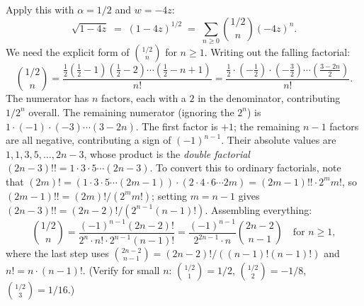 Apply this with $\alpha = 1/2$ and $w = -4z$:
\[
  \sqrt{1-4z} \;=\; (1-4z)^{1/2} \;=\; \sum_{n \ge 0} \binom{1/2}{n}(-4z)^n.
\]
We need the explicit form of $\binom{1/2}{n}$ for $n \ge 1$. Writing out the falling factorial:
\[
  \binom{1/2}{n} = \frac{\tfrac{1}{2}(\tfrac{1}{2}-1)(\tfrac{1}{2}-2)\cdots(\tfrac{1}{2}-n+1)}{n!}
  = \frac{\tfrac{1}{2}\cdot(-\tfrac{1}{2})\cdot(-\tfrac{3}{2})\cdots(\tfrac{3-2n}{2})}{n!}.
\]
The numerator has $n$ factors, each with a $2$ in the denominator, contributing $1/2^n$ overall. The remaining numerator (ignoring the $2^n$) is $1 \cdot (-1) \cdot (-3) \cdots (3-2n)$. The first factor is $+1$; the remaining $n-1$ factors are all negative, contributing a sign of $(-1)^{n-1}$. Their absolute values are $1, 1, 3, 5, \ldots, 2n-3$, whose product is the \emph{double factorial} $(2n-3)!! = 1 \cdot 3 \cdot 5 \cdots (2n-3)$. To convert this to ordinary factorials, note that $(2m)! = (1 \cdot 3 \cdot 5 \cdots (2m-1)) \cdot (2 \cdot 4 \cdot 6 \cdots 2m) = (2m-1)!! \cdot 2^m m!$, so $(2m-1)!! = (2m)!/(2^m m!)$; setting $m = n-1$ gives $(2n-3)!! = (2n-2)!/(2^{n-1}(n-1)!)$. Assembling everything:
\[
  \binom{1/2}{n}
  = \frac{(-1)^{n-1}(2n-2)!}{2^n \cdot n! \cdot 2^{n-1}(n-1)!}
  = \frac{(-1)^{n-1}}{2^{2n-1}\cdot n}\binom{2n-2}{n-1} \quad\text{for } n \ge 1,
\]
where the last step uses $\binom{2n-2}{n-1} = (2n-2)!/((n-1)!(n-1)!)$ and $n! = n \cdot (n-1)!$. (Verify for small $n$: $\binom{1/2}{1} = 1/2$, $\binom{1/2}{2} = -1/8$, $\binom{1/2}{3} = 1/16$.)

